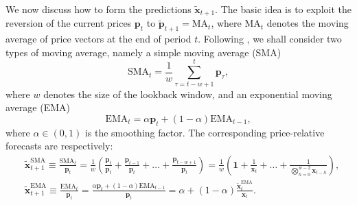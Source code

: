 We now discuss how to form the predictions $\widetilde{\mathbf{x}}_{t+1}$. The basic idea is to exploit the reversion of the current prices $\mathbf{p}_t$ to $\widetilde{\mathbf{p}}_{t+1} = \mathrm{MA}_t$, where $\mathrm{MA}_t$ denotes the moving average of price vectors at the end of period $t$. Following \citet{olmar}, we shall consider two types of moving average, namely a simple moving average (SMA)
\begin{equation}
\label{eq:sma}
	\mathrm{SMA}_t
	= \frac{1}{w}\sum_{\tau=t-w+1}^t \mathbf{p}_\tau,
\end{equation}
where $w$ denotes the size of the lookback window, and an exponential moving average (EMA)
\begin{equation}
\label{eq:ema}
	\mathrm{EMA}_t
	= \alpha\mathbf{p}_t + (1-\alpha)\mathrm{EMA}_{t-1},
\end{equation}
where $\alpha \in (0, 1)$ is the smoothing factor. The corresponding price-relative forecasts are respectively:
\begin{align}
	& \widetilde{\mathbf{x}}_{t+1}^\text{SMA}
	\equiv \frac{\mathrm{SMA}_t}{\mathbf{p}_t}
	= \frac{1}{w}\left(\frac{\mathbf{p}_t}{\mathbf{p}_t} + \frac{\mathbf{p}_{t-1}}{\mathbf{p}_t} + \ldots + \frac{\mathbf{p}_{t-w+1}}{\mathbf{p}_t}\right)
	= \frac{1}{w}\left(\mathbf{1} + \frac{1}{\mathbf{x}_t} + \ldots + \frac{1}{\bigotimes_{h=0}^{w-2}\mathbf{x}_{t-h}}\right),
	\\
	& \widetilde{\mathbf{x}}_{t+1}^\text{EMA}
	\equiv \frac{\mathrm{EMA}_t}{\mathbf{p}_t}
	= \frac{\alpha\mathbf{p}_t + (1-\alpha)\mathrm{EMA}_{t-1}}{\mathbf{p}_t}
	= \alpha + (1-\alpha)\frac{\widetilde{\mathbf{x}}_{t}^\text{EMA}}{\mathbf{x}_t}.
\end{align}

